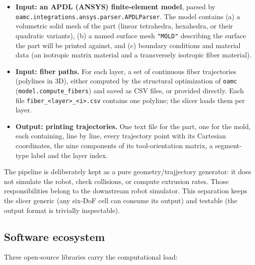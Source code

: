 \begin{itemize}
  \item \textbf{Input: an APDL (ANSYS) finite-element model}, parsed by
        \texttt{oamc.integrations.ansys.parser.APDLParser}. The model
        contains (a) a volumetric solid mesh of the part (linear
        tetrahedra, hexahedra, or their quadratic variants), (b) a
        named surface mesh \texttt{"MOLD"} describing the surface the
        part will be printed against, and (c) boundary conditions and
        material data (an isotropic matrix material and a transversely
        isotropic fiber material).
  \item \textbf{Input: fiber paths.} For each layer, a set of
        continuous fiber trajectories (polylines in 3D), either
        computed by the structural optimization of \texttt{oamc}
        (\texttt{model.compute\_fibers}) and saved as CSV files, or
        provided directly. Each file \texttt{fiber\_<layer>\_<i>.csv}
        contains one polyline; the slicer loads them per layer.
  \item \textbf{Output: printing trajectories.} One text file for the
        part, one for the mold, each containing, line by line, every
        trajectory point with its Cartesian coordinates, the nine
        components of its tool-orientation matrix, a segment-type label
        and the layer index.
\end{itemize}

The pipeline is deliberately kept as a pure geometry/trajjectory
generator: it does not simulate the robot, check collisions, or compute
extrusion rates. Those responsibilities belong to the downstream robot
simulator. This separation keeps the slicer generic (any six-DoF cell
can consume its output) and testable (the output format is trivially
inspectable).

\subsection{Software ecosystem}

Three open-source libraries carry the computational load:

